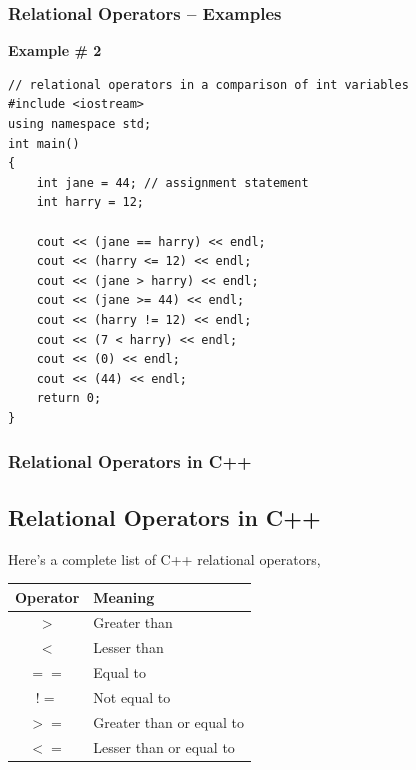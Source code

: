 \documentclass{beamer}
\begin{document}
\begin{frame}[fragile]
    \frametitle{Relational Operators -- Examples}
    \textbf{Example \# 2}
    \lstset{style=mystyle}
    \begin{lstlisting}
// relational operators in a comparison of int variables
#include <iostream>
using namespace std;
int main()
{
    int jane = 44; // assignment statement
    int harry = 12;

    cout << (jane == harry) << endl;
    cout << (harry <= 12) << endl;
    cout << (jane > harry) << endl;
    cout << (jane >= 44) << endl;
    cout << (harry != 12) << endl;
    cout << (7 < harry) << endl;
    cout << (0) << endl;
    cout << (44) << endl;
    return 0;
}\end{lstlisting}
\end{frame}

\begin{frame}
    \frametitle{Relational Operators in C++}
    \subsection{Relational Operators in C++} %
    \label{sub:a_complete_list}
    Here's a complete list of C++ relational operators,
    \begin{table}
        \begin{tabular}{c | l}
        Operator & Meaning \\
        \hline \hline
        $>$ & Greater than \\
        $<$ & Lesser than\\
        $==$ & Equal to\\
        $!=$ & Not equal to\\
        $>=$ & Greater than or equal to\\
        $<=$ & Lesser than or equal to
        \end{tabular}
    \end{table}
\end{frame}
\end{document}
